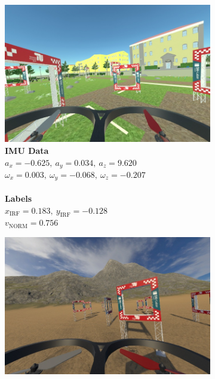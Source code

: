 \begin{figure}[H]
\begin{subfigure}[b]{1.0\textwidth}
\begin{minipage}[c]{0.5\textwidth}
	  	\end{minipage}
	\end{subfigure}
	\begin{subfigure}[b]{1.0\textwidth}
		\centering
		\begin{minipage}[c]{0.37\textwidth}
			\includegraphics[width=\textwidth]{figures/camera_frame_00800.jpg}
	  	\end{minipage}\hfill
	  	\begin{minipage}[c]{0.5\textwidth}
			\caption{
				\textbf{IMU Data}\\
				$a_x = -0.625,\ a_y = 0.034,\ a_z = 9.620$\\
				$\omega_x = 0.003,\ \omega_y = -0.068,\ \omega_z = -0.207$\\
				\\
				\textbf{Labels}\\
				$x_\text{IRF} = 0.183,\ y_\text{IRF} = -0.128$\\
				$v_\text{NORM} = 0.756$
				}  
	  	\end{minipage}
	\end{subfigure}
	\begin{subfigure}[b]{1.0\textwidth}
		\centering
		\begin{minipage}[c]{0.37\textwidth}
			\includegraphics[width=\textwidth]{figures/camera_frame_01000.jpg}

\end{minipage}
\end{subfigure}
\end{figure}
